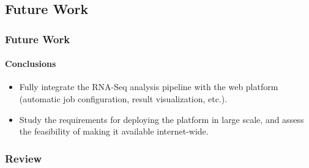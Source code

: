\documentclass[xcolor=dvipsnames]{beamer}
\begin{document}
\subsection{Future Work}
\begin{frame}
  \frametitle{Future Work}
  \framesubtitle{Conclusions}

\begin{itemize}
\item
Fully integrate the RNA-Seq analysis pipeline with the web platform (automatic
job configuration, result visualization, etc.).\\ \vspace{1.2cm}

\item
Study the requirements for deploying the platform in large scale, and assess the
feasibility of making it available internet-wide.
\end{itemize}


\end{frame}


\begin{frame}
  \frametitle{Review}
  \tableofcontents
\end{frame}


{

\frame{\titlepage}
}
\end{document}
